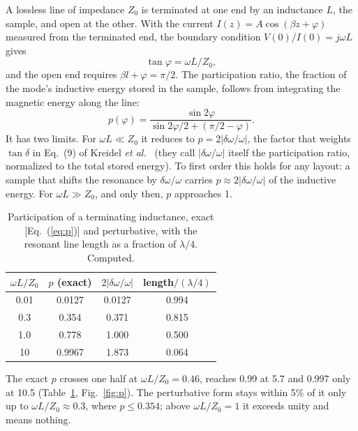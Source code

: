 \documentclass[aps,prb,reprint,superscriptaddress,longbibliography]{revtex4-2}
\begin{document}
A lossless line of impedance $Z_0$ is terminated at one end by an
inductance $L$, the sample, and open at the other. With the current
$I(z) = A\cos(\beta z + \varphi)$ measured from the terminated end, the
boundary condition $V(0)/I(0) = j\omega L$ gives
\begin{equation}
\tan\varphi = \omega L/Z_0 ,
\label{eq:phi}
\end{equation}
and the open end requires $\beta l + \varphi = \pi/2$. The participation
ratio, the fraction of the mode's inductive energy stored in the sample,
follows from integrating the magnetic energy along the line:
\begin{equation}
p(\varphi) = \frac{\sin 2\varphi}{\sin 2\varphi/2 + (\pi/2 - \varphi)} .
\label{eq:p}
\end{equation}
It has two limits. For $\omega L \ll Z_0$ it reduces to
$p = 2|\delta\omega/\omega|$, the factor that weights $\tan\delta$ in
Eq.~(9) of Kreidel \emph{et al.}~\cite{Kreidel2024} (they call
$|\delta\omega/\omega|$ itself the participation ratio, normalized to
the total stored energy). To first order this holds for any layout: a
sample that shifts the resonance by $\delta\omega/\omega$ carries
$p \approx 2|\delta\omega/\omega|$ of the inductive energy. For
$\omega L \gg Z_0$, and only then, $p$ approaches 1.

\begin{table}[!tbp]
\caption{\label{tab:p}Participation of a terminating inductance, exact
[Eq.~(\ref{eq:p})] and perturbative, with the resonant line length as a
fraction of $\lambda/4$. Computed.}
\begin{ruledtabular}
\begin{tabular}{cccc}
$\omega L/Z_0$ & $p$ (exact) & $2|\delta\omega/\omega|$ & length$/(\lambda/4)$ \\
\hline
0.01 & 0.0127 & 0.0127 & 0.994 \\
0.3  & 0.354  & 0.371  & 0.815 \\
1.0  & 0.778  & 1.000  & 0.500 \\
10   & 0.9967 & 1.873  & 0.064 \\
\end{tabular}
\end{ruledtabular}
\end{table}

The exact $p$ crosses one half at $\omega L/Z_0 = 0.46$, reaches 0.99 at
5.7 and 0.997 only at 10.5 (Table~\ref{tab:p}, Fig.~\ref{fig:p}). The
perturbative form stays within 5\% of it only up to $\omega L/Z_0
\approx 0.3$, where $p \leq 0.354$; above $\omega L/Z_0 = 1$ it exceeds
unity and means nothing.
\end{document}
